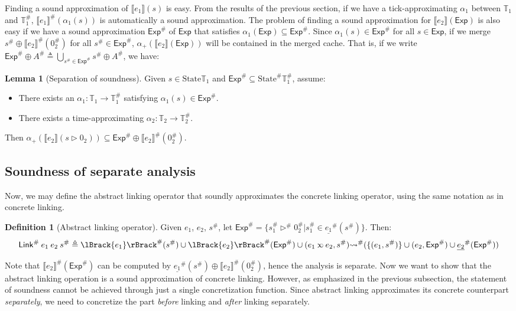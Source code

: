 \documentclass[acmsmall,review]{acmart}\settopmatter{printfolios=true,printccs=false,printacmref=false}
\theoremstyle{definition}
\newtheorem{definition}{Definition}[section]
\newtheorem{lem}{Lemma}[section]
\newcommand*{\A}[1]{{#1}^{\#}}
\newcommand*{\Time}{\mathbb{T}}
\newcommand*{\ATime}{\A{\Time}}
\newcommand*{\State}{\text{State}}
\newcommand*{\AState}{\A{\text{State}}}
\newcommand*{\semlink}{\mathbin{\rotatebox[origin=c]{180}{$\propto$}}}
\newcommand*{\link}[2]{{#1}\semlink{#2}}
\newcommand*{\Exp}{\mathsf{Exp}}
\newcommand*{\Link}{\mathsf{Link}}
\newcommand*{\sembracket}[1]{\lBrack{#1}\rBrack}
\begin{document}
Finding a sound approximation of $\sembracket{e_1}(s)$ is easy.
From the results of the previous section, if we have a tick-approximating $\alpha_1$ between $\Time_1$ and $\ATime_1$, $\A{\sembracket{e_1}}(\alpha_1(s))$ is automatically a sound approximation.
The problem of finding a sound approximation for $\sembracket{e_2}(\Exp)$ is also easy if we have a sound approximation $\A\Exp$ of $\Exp$ that satisfies $\alpha_1(\Exp)\subseteq\A\Exp$.
Since $\alpha_1(s)\in\A\Exp$ for all $s\in\Exp$, if we merge $\A{s}\oplus\A{\sembracket{e_2}}(\A{0}_2)$ for all $\A{s}\in\A\Exp$, $\alpha_+(\sembracket{e_2}(\Exp))$ will be contained in the merged cache.
That is, if we write $\A{\Exp}\oplus\A{A}\triangleq\bigcup_{\A{s}\in\A\Exp}\A{s}\oplus\A{A}$, we have:
\begin{lem}[Separation of soundness]
  Given $s\in\State{\Time_1}$ and $\A\Exp\subseteq\AState{\ATime_1}$, assume:
  \begin{itemize}
    \item There exists an $\alpha_1:\Time_1\rightarrow\ATime_1$ satisfying $\alpha_1(s)\in\A{\Exp}$.
    \item There exists a time-approximating $\alpha_2:\Time_2\rightarrow\ATime_2$.
  \end{itemize}

  Then $\alpha_+(\sembracket{e_2}(s\rhd0_2))\subseteq\A\Exp\oplus\A{\sembracket{e_2}}(\A{0}_2)$.
\end{lem}

\subsection{Soundness of separate analysis}
Now, we may define the abstract linking operator that soundly approximates the concrete linking operator, using the same notation as in concrete linking.
\begin{definition}[Abstract linking operator]
  Given $e_1$, $e_2$, $\A{s}$, let $\A\Exp=\{\A{s}_1\A\rhd\A{0}_2|\A{s}_1\in\A{\underline{e_1}}(\A{s})\}$. Then:
  \[\A\Link\:e_1\:e_2\:\A{s}\triangleq\A{\sembracket{e_1}}(\A{s})\cup\A{\sembracket{e_2}}(\A\Exp)\cup(\link{e_1}{e_2},\A{s})\A\rightsquigarrow(\{(e_1,\A{s})\}\cup(e_2,\A\Exp)\cup\A{\underline{e_2}}(\A\Exp))\]
\end{definition}
Note that $\A{\sembracket{e_2}}(\A\Exp)$ can be computed by $\A{\underline{e_1}}(\A{s})\oplus\A{\sembracket{e_2}}(\A{0}_2)$, hence the analysis is separate.
Now we want to show that the abstract linking operation is a sound approximation of concrete linking.
However, as emphasized in the previous subsection, the statement of soundness cannot be achieved through just a single concretization function.
Since abstract linking approximates its concrete counterpart \emph{separately}, we need to concretize the part \emph{before} linking and \emph{after} linking separately.
\end{document}
